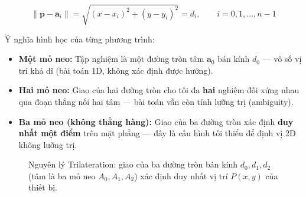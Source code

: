 \begin{equation}
    \lVert \mathbf{p} - \mathbf{a}_i \rVert = \sqrt{(x - x_i)^2 + (y - y_i)^2} = d_i, \qquad i = 0, 1, \dots, n-1
\end{equation}

Ý nghĩa hình học của từng phương trình:
\begin{itemize}
    \item \textbf{Một mỏ neo:} Tập nghiệm là một đường tròn tâm $\mathbf{a}_0$ bán kính $d_0$ --- vô số vị trí khả dĩ (bài toán 1D, không xác định được hướng).
    \item \textbf{Hai mỏ neo:} Giao của hai đường tròn cho tối đa \textbf{hai} nghiệm đối xứng nhau qua đoạn thẳng nối hai tâm --- bài toán vẫn còn tính lưỡng trị (ambiguity).
    \item \textbf{Ba mỏ neo (không thẳng hàng):} Giao của ba đường tròn xác định \textbf{duy nhất một điểm} trên mặt phẳng --- đây là cấu hình tối thiểu để định vị 2D không lưỡng trị.
\end{itemize}

\begin{figure}[H]
    \centering
    \caption[Nguyên lý Trilateration với ba mỏ neo]{Nguyên lý Trilateration: giao của ba đường tròn bán kính $d_0, d_1, d_2$ (tâm là ba mỏ neo $A_0, A_1, A_2$) xác định duy nhất vị trí $P(x,y)$ của thiết bị.}
    \label{fig:trilateration_principle}
\end{figure}

